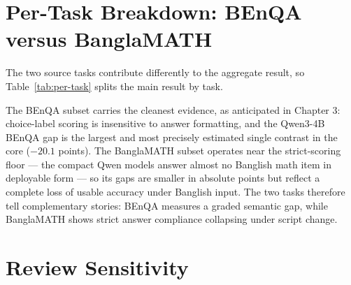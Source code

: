 \section{Per-Task Breakdown: BEnQA versus BanglaMATH}

The two source tasks contribute differently to the aggregate result, so Table~\ref{tab:per-task} splits the main result by task.

\begin{table}[H]
\centering
\caption{Validation-200 v5 results split by source task. Gaps are reviewed Banglish minus Bangla with paired bootstrap 95\% CIs.}
\label{tab:per-task}
\small
{}
\end{table}

The BEnQA subset carries the cleanest evidence, as anticipated in Chapter 3: choice-label scoring is insensitive to answer formatting, and the Qwen3-4B BEnQA gap is the largest and most precisely estimated single contrast in the core ($-20.1$ points). The BanglaMATH subset operates near the strict-scoring floor --- the compact Qwen models answer almost no Banglish math item in deployable form --- so its gaps are smaller in absolute points but reflect a complete loss of usable accuracy under Banglish input. The two tasks therefore tell complementary stories: BEnQA measures a graded semantic gap, while BanglaMATH shows strict answer compliance collapsing under script change.

\section{Review Sensitivity}

